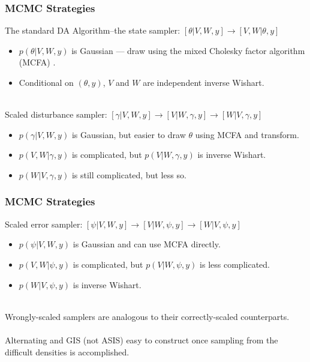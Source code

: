 \documentclass[xcolor=dvipsnames]{beamer}
\begin{document}
\begin{frame}
\frametitle{MCMC Strategies}
The standard DA Algorithm--the state sampler: {\color{red}$[\theta|V,W,y] \to [V,W|\theta,y]$}
\begin{itemize}
\item $p(\theta|V,W,y)$ is Gaussian --- draw using the mixed Cholesky factor algorithm (MCFA) \citep{mccausland2011simulation}.
\item Conditional on $(\theta,y)$, $V$ and $W$ are independent inverse Wishart.\\~\\
\end{itemize}

Scaled disturbance sampler: {\color{red}$[\gamma|V,W,y] \to [V|W,\gamma,y] \to [W|V,\gamma,y]$}
\begin{itemize}
\item $p(\gamma|V,W,y)$ is Gaussian, but easier to draw $\theta$ using MCFA and transform.
\item $p(V,W|\gamma,y)$ is complicated, but $p(V|W,\gamma,y)$ is inverse Wishart.
\item $p(W|V,\gamma,y)$ is still complicated, but less so.
\end{itemize}
\end{frame}

\begin{frame}
\frametitle{MCMC Strategies}
Scaled error sampler: {\color{red}$[\psi|V,W,y] \to [V|W,\psi,y] \to [W|V,\psi,y]$}
\begin{itemize}
\item $p(\psi|V,W,y)$ is Gaussian and can use MCFA directly.
\item $p(V,W|\psi,y)$ is complicated, but $p(V|W,\psi,y)$ is less complicated. 
\item $p(W|V,\psi,y)$ is inverse Wishart.\\~\\
\end{itemize}

Wrongly-scaled samplers are analogous to their correctly-scaled counterparts.\\~\\

Alternating and GIS (not ASIS) easy to construct once sampling from the difficult densities is accomplished.
\end{frame}
\end{document}
